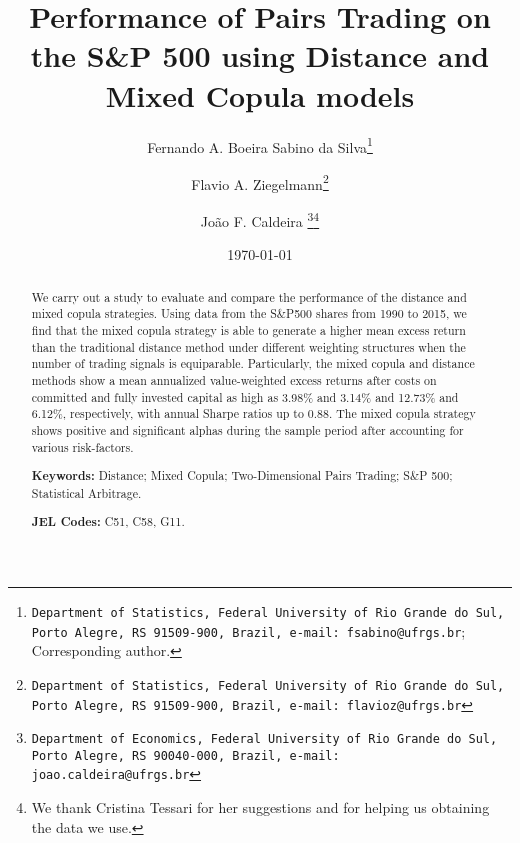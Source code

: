 \documentclass[a4paper]{article}
\begin{document}
	
	
	\makeatletter
	\def\@maketitle{%
		\newpage
		\null
		\vskip 2em%
		\begin{center}%
			\let \footnote \thanks
			{\Large\bfseries \@title \par}%
			\vskip 1.5em%
			{\normalsize
				\lineskip .5em%
				\begin{tabular}[t]{c}%
					\@author
				\end{tabular}\par}%
			\vskip 1em%
			{\normalsize \@date}%
		\end{center}%
		\par
		\vskip 1.5em}
	\makeatother
	
	\title{Performance of Pairs Trading on the S\&P 500 using Distance and Mixed Copula models}
	\author[]{ Fernando A. Boeira Sabino da Silva\thanks{\texttt{Department of Statistics, Federal University of Rio Grande do Sul, Porto Alegre, RS 91509-900, Brazil, e-mail: fsabino@ufrgs.br}; Corresponding author.}}
	\author[]{Flavio A. Ziegelmann\thanks{\texttt{Department of Statistics, Federal University of Rio Grande do Sul, Porto Alegre, RS 91509-900, Brazil, e-mail: flavioz@ufrgs.br}}}
	\author[]{João F. Caldeira \thanks{\texttt{Department of Economics, Federal University of Rio Grande do Sul, Porto Alegre, RS 90040-000, Brazil, e-mail: joao.caldeira@ufrgs.br}}\thanks{We thank Cristina Tessari for her suggestions and for helping us obtaining the data we use.}}
	\affil[]{}
	\date{\today}
	\maketitle
	
	
	\begin{abstract}
		We carry out a study to evaluate and compare the performance of the distance and mixed copula strategies. Using data from the S\&P500 shares from 1990 to 2015, we find that the mixed copula strategy is able to generate a higher mean excess return than the traditional distance method under different weighting structures when the number of trading signals is equiparable. Particularly, the mixed copula and distance methods show a mean annualized value-weighted excess returns after costs on committed and fully invested capital as high as 3.98\% and 3.14\% and 12.73\% and 6.12\%, respectively, with annual Sharpe ratios up to 0.88. The mixed copula strategy shows positive and significant alphas during the sample period after accounting for various risk-factors.
		
		\smallskip
		
		\noindent \textbf{Keywords:} Distance; Mixed Copula; Two-Dimensional Pairs Trading; S\&P 500; Statistical Arbitrage.
		
		\noindent \textbf{JEL Codes:} C51, C58, G11.
	\end{abstract}
	
\end{document}
